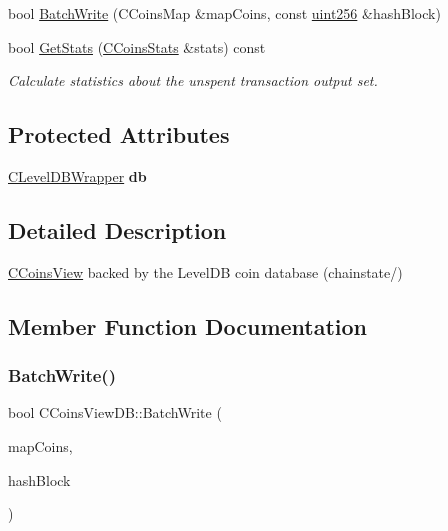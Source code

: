 \begin{DoxyCompactItemize}
bool \mbox{\hyperlink{class_c_coins_view_d_b_a33f98ec9323ce48e1704327bc8a2a002}{Batch\+Write}} (C\+Coins\+Map \&map\+Coins, const \mbox{\hyperlink{classuint256}{uint256}} \&hash\+Block)
\item 
\mbox{\label{class_c_coins_view_d_b_a227bf56f8801921f12e56c6839104fce}} 
bool \mbox{\hyperlink{class_c_coins_view_d_b_a227bf56f8801921f12e56c6839104fce}{Get\+Stats}} (\mbox{\hyperlink{struct_c_coins_stats}{C\+Coins\+Stats}} \&stats) const
\begin{DoxyCompactList}\small\item\em Calculate statistics about the unspent transaction output set. \end{DoxyCompactList}\end{DoxyCompactItemize}
\subsection*{Protected Attributes}
\begin{DoxyCompactItemize}
\item 
\mbox{\label{class_c_coins_view_d_b_aba0a7b26fe82c1a2e80ca060d12fb66a}} 
\mbox{\hyperlink{class_c_level_d_b_wrapper}{C\+Level\+D\+B\+Wrapper}} {\bfseries db}
\end{DoxyCompactItemize}


\subsection{Detailed Description}
\mbox{\hyperlink{class_c_coins_view}{C\+Coins\+View}} backed by the Level\+DB coin database (chainstate/) 

\subsection{Member Function Documentation}
\mbox{\label{class_c_coins_view_d_b_a33f98ec9323ce48e1704327bc8a2a002}} 
\subsubsection{\texorpdfstring{BatchWrite()}{BatchWrite()}}
{\footnotesize\ttfamily bool C\+Coins\+View\+D\+B\+::\+Batch\+Write (\begin{DoxyParamCaption}\item[{C\+Coins\+Map \&}]{map\+Coins,  }\item[{const \mbox{\hyperlink{classuint256}{uint256}} \&}]{hash\+Block }\end{DoxyParamCaption})\hspace{0.3cm}{\ttfamily [virtual]}}

